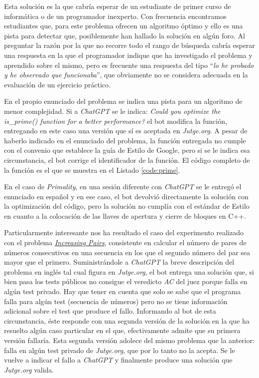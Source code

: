 \documentclass[twocolumn,twoside,a4paper, 10pt]{article}
\newcommand{\jutge}{\textit{Jutge.org}{}}           %
\newcommand{\ChatGPT}{\textit{ChatGPT}{}}           %
\begin{document}
Esta solución es la que cabría esperar de un estudiante de primer curso de informática o de un programador
inexperto.
Con frecuencia encontramos estudiantes que, para este problema ofrecen un algoritmo óptimo y ello es una pista 
para detectar que, posiblemente han hallado la solución en algún foro. 
Al preguntar la razón por la que no recorre todo el rango de búsqueda cabría esperar una
respuesta en la que el programador indique que ha investigado el problema y aprendido sobre el mismo, pero es
frecuente una respuesta del tipo ``\textit{lo he probado y he observado que funcionaba}'', que obviamente no se
considera adecuada en la evaluación de un ejercicio práctico.

En el propio enunciado del problema se indica una pista para un algoritmo de menor complejidad.
Si a \ChatGPT{} se le indica:
\textit{Could you optimize the is\_prime() function for a better performance?}
el bot modifica la función, entregando en este caso una versión que sí es aceptada en \textit{Jutge.org}.
A pesar de haberlo indicado en el enunciado del problema, la función entregada no cumple con el convenio que
establece la guía de Estilo de Google, pero si se le indica esa circunstancia, el bot corrige el identificador
de la función. 
El código completo de la función es el que se muestra en el Listado \ref{code:prime}.


En el caso de \textit{Primality}, en una sesión diferente con \ChatGPT{} se le entregó el enunciado en español y
en ese caso, el bot devolvió directamente la solución con la optimización del código, pero la solución no cumplía
con el estándar de Estilo en cuanto a la colocación de las llaves de apertura y cierre de bloques en C++.

Particularmente interesante nos ha resultado el caso del experimento realizado con el problema
\href{https://jutge.org/problems/P73501_en/statement}{\textit{Increasing Pairs}}, 
consistente en calcular el número de pares de números consecutivos en una secuencia en los que el segundo
número del par sea mayor que el primero.
Suministrándole a \ChatGPT{} la breve descripción del problema en inglés tal cual figura en \jutge{}, el bot
entrega una solución que, si bien pasa los tests públicos no consigue el veredicto \textit{AC} del juez porque
falla en algún test privado.
Hay que tener en cuenta que solo se sabe que el programa falla para algún test (secuencia de números) pero no
se tiene información adicional sobre el test que produce el fallo.
Informando al bot de esta circunstancia, éste responde con una segunda versión de la solución en la que ha
resuelto algún caso particular en el que, efectivamente admite que su primera versión fallaría.
Esta segunda versión adolece del mismo problema que la anterior: falla en algún test privado de \jutge{}, que
por lo tanto no la acepta.
Se le vuelve a indicar el fallo a \ChatGPT{} y finalmente produce una solución que \jutge{} valida.
\end{document}
